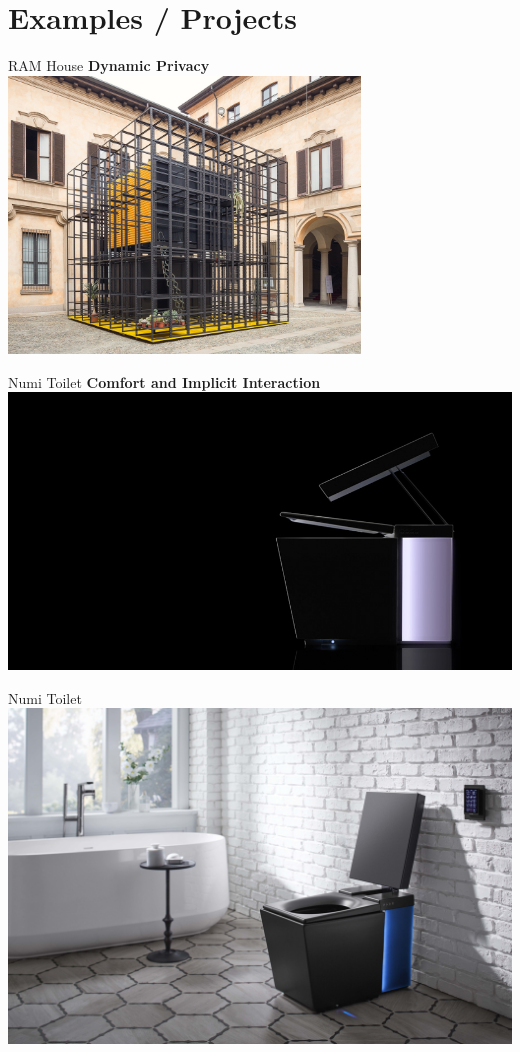 \documentclass[10pt]{beamer}
\begin{document}
\section{Examples / Projects}


\begin{frame}{RAM House}
	\textbf{Dynamic Privacy}\\
	\vspace{3mm}
	\includegraphics[width=0.7\textwidth]{images/1.jpg}
\end{frame}

\begin{frame}{Numi Toilet}
	\textbf{Comfort and Implicit Interaction}\\
	\vspace{3mm}
	\includegraphics[width=\textwidth]{images/3.jpg}
\end{frame}

\begin{frame}{Numi Toilet}
\includegraphics[width=\textwidth]{images/6.jpg}
\end{frame}
\end{document}
